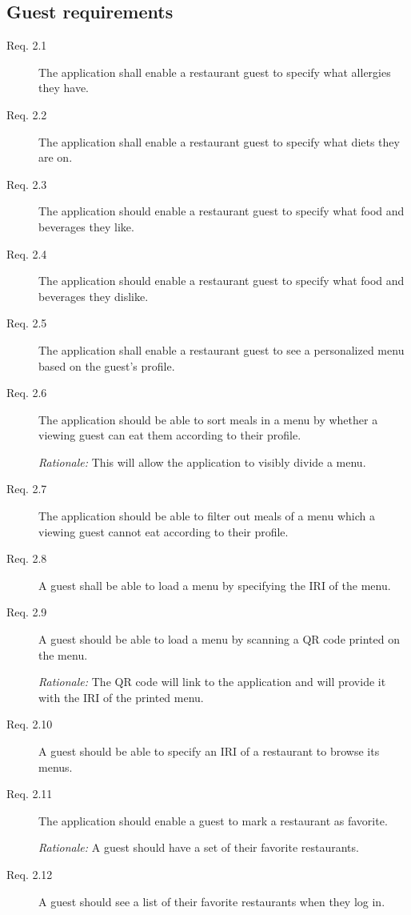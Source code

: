 \subsection{Guest requirements}
\begin{description}
    \item [Req. 2.1] The application shall enable a restaurant guest to specify what allergies they have.
    \item [Req. 2.2] The application shall enable a restaurant guest to specify what diets they are on.
    \item [Req. 2.3] The application should enable a restaurant guest to specify what food and beverages they like.
    \item [Req. 2.4] The application should enable a restaurant guest to specify what food and beverages they dislike.
    \item [Req. 2.5] The application shall enable a restaurant guest to see a personalized menu based on the guest's profile.
    \item [Req. 2.6] The application should be able to sort meals in a menu by whether a viewing guest can eat them according to their profile.

    \emph{Rationale:} This will allow the application to visibly divide a menu.
    \item [Req. 2.7] The application should be able to filter out meals of a menu which a viewing guest cannot eat according to their profile.
    \item [Req. 2.8] A guest shall be able to load a menu by specifying the IRI of the menu.
    \item [Req. 2.9] A guest should be able to load a menu by scanning a QR code printed on the menu.

    \emph{Rationale:} The QR code will link to the application and will provide it with the IRI of the printed menu.
    \item [Req. 2.10] A guest should be able to specify an IRI of a restaurant to browse its menus.
    \item [Req. 2.11] The application should enable a guest to mark a restaurant as favorite.
    
    \emph{Rationale:} A guest should have a set of their favorite restaurants.
    \item [Req. 2.12] A guest should see a list of their favorite restaurants when they log in.
\end{description}

